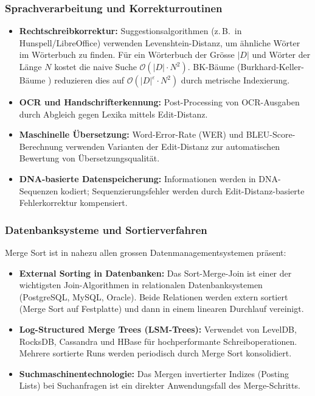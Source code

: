 ﻿\documentclass[a4paper,12pt]{article}
\theoremstyle{definition}
\begin{document}
\subsubsection{Sprachverarbeitung und Korrekturroutinen}

\begin{itemize}
    \item \textbf{Rechtschreibkorrektur:} Suggestionsalgorithmen (z.\,B.\ in
          Hunspell/LibreOffice) verwenden Levenshtein-Distanz, um ähnliche
          Wörter im Wörterbuch zu finden. Für ein Wörterbuch der Grösse $|D|$
          und Wörter der Länge $N$ kostet die naive Suche $\mathcal{O}(|D| \cdot N^2)$.
          BK-Bäume (Burkhard-Keller-Bäume \cite{burkhard1973}) reduzieren dies
          auf $\mathcal{O}(|D|^\varepsilon \cdot N^2)$ durch metrische Indexierung.
    \item \textbf{OCR und Handschrifterkennung:} Post-Processing von OCR-Ausgaben
          durch Abgleich gegen Lexika mittels Edit-Distanz.
    \item \textbf{Maschinelle Übersetzung:} Word-Error-Rate (WER) und
          BLEU-Score-Berechnung verwenden Varianten der Edit-Distanz zur
          automatischen Bewertung von Übersetzungsqualität.
    \item \textbf{DNA-basierte Datenspeicherung:} Informationen werden in
          DNA-Sequenzen kodiert; Sequenzierungsfehler werden durch
          Edit-Distanz-basierte Fehlerkorrektur kompensiert.
\end{itemize}

\subsubsection{Datenbanksysteme und Sortierverfahren}

Merge Sort ist in nahezu allen grossen Datenmanagementsystemen präsent:
\begin{itemize}
    \item \textbf{External Sorting in Datenbanken:} Das Sort-Merge-Join ist
          einer der wichtigsten Join-Algorithmen in relationalen
          Datenbanksystemen (PostgreSQL, MySQL, Oracle). Beide Relationen werden
          extern sortiert (Merge Sort auf Festplatte) und dann in einem linearen
          Durchlauf vereinigt.
    \item \textbf{Log-Structured Merge Trees (LSM-Trees):} Verwendet von
          LevelDB, RocksDB, Cassandra und HBase für hochperformante
          Schreiboperationen. Mehrere sortierte Runs werden periodisch durch
          Merge Sort konsolidiert.
    \item \textbf{Suchmaschinentechnologie:} Das Mergen invertierter Indizes
          (Posting Lists) bei Suchanfragen ist ein direkter Anwendungsfall
          des Merge-Schritts.
\end{itemize}
\end{document}
